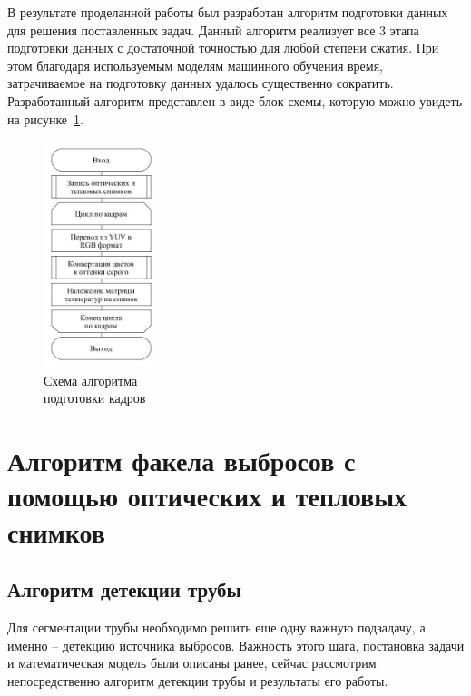 \documentclass[14pt, a4paper]{extreport}
\begin{document}
	В результате проделанной работы был разработан алгоритм подготовки данных для решения поставленных задач. Данный алгоритм реализует все 3 этапа подготовки данных с достаточной точностью для любой степени сжатия. При этом благодаря используемым моделям машинного обучения время, затрачиваемое на подготовку данных удалось существенно сократить. Разработанный алгоритм представлен в виде блок схемы, которую можно увидеть на рисунке~\ref{fig:fullprepare}.
	\vspace*{-0.2cm}
	\begin{figure}[h!]
		\centering
		\includegraphics[width = 0.3\textwidth]{image/chapter_2/fullprepare}	
		\vspace*{-0.4cm}\caption{Схема алгоритма \\подготовки кадров}
		\label{fig:fullprepare}
	\end{figure}
	
\section[\vspace*{-0.22cm}Алгоритм сегментации факела выбросов с помощью оптических \\ \hspace*{-0.75cm}и тепловых снимков]{\vspace*{-0.22cm}Алгоритм  факела выбросов с помощью оптических и тепловых \\ \hspace*{-2.05cm}снимков}
\subsection{Алгоритм детекции трубы}
	
	Для сегментации трубы необходимо решить еще одну важную подзадачу, а именно -- детекцию источника выбросов. Важность этого шага, постановка задачи и математическая модель были описаны ранее, сейчас рассмотрим непосредственно алгоритм детекции трубы и результаты его работы.
	
\end{document}
